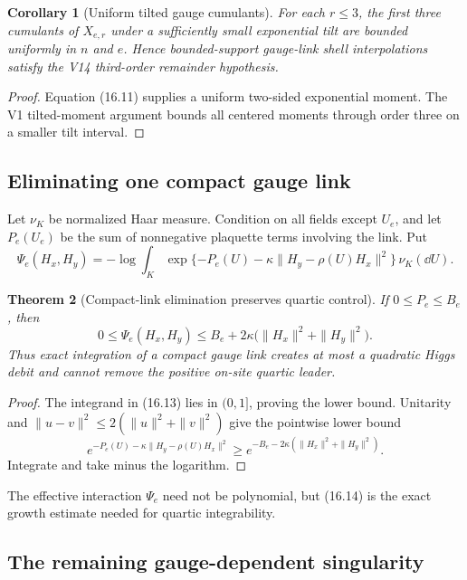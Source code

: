 \documentclass[11pt]{article}
\newtheorem{theorem}{Theorem}[section]
\newtheorem{corollary}[theorem]{Corollary}
\theoremstyle{remark}
\begin{document}
\begin{corollary}[Uniform tilted gauge cumulants]
\label{cor:v17v16-gauge-cumulants}
For each \(r\leq3\), the first three cumulants of \(X_{e,r}\) under
a sufficiently small exponential tilt are bounded uniformly in
\(n\) and \(e\).  Hence bounded-support gauge-link shell
interpolations satisfy the V14 third-order remainder hypothesis.
\end{corollary}

\begin{proof}
Equation (16.11) supplies a uniform two-sided exponential moment.
The V1 tilted-moment argument bounds all centered moments through
order three on a smaller tilt interval.
\end{proof}

\subsection{Eliminating one compact gauge link}

Let \(\nu_K\) be normalized Haar measure.  Condition on all fields
except \(U_e\), and let \(P_e(U_e)\) be the sum of nonnegative
plaquette terms involving the link.  Put
\[
 \Psi_e(H_x,H_y)
 =-\log\int_K
 \exp\{-P_e(U)-\kappa\|H_y-\rho(U)H_x\|^2\}
 \,\nu_K(\dd U).                                   \tag{16.13}
\]

\begin{theorem}[Compact-link elimination preserves quartic control]
\label{thm:v17v16-link-elimination}
If \(0\leq P_e\leq B_e\), then
\[
 0\leq\Psi_e(H_x,H_y)
 \leq
 B_e+2\kappa\bigl(\|H_x\|^2+\|H_y\|^2\bigr).       \tag{16.14}
\]
Thus exact integration of a compact gauge link creates at most a
quadratic Higgs debit and cannot remove the positive on-site
quartic leader.
\end{theorem}

\begin{proof}
The integrand in (16.13) lies in \((0,1]\), proving the lower
bound.  Unitarity and
\(\|u-v\|^2\leq2(\|u\|^2+\|v\|^2)\) give the pointwise lower bound
\[
 e^{-P_e(U)-\kappa\|H_y-\rho(U)H_x\|^2}
 \geq
 e^{-B_e-2\kappa(\|H_x\|^2+\|H_y\|^2)}.
\]
Integrate and take minus the logarithm.
\end{proof}

The effective interaction \(\Psi_e\) need not be polynomial, but
(16.14) is the exact growth estimate needed for quartic
integrability.

\subsection{The remaining gauge-dependent singularity}
\end{document}

